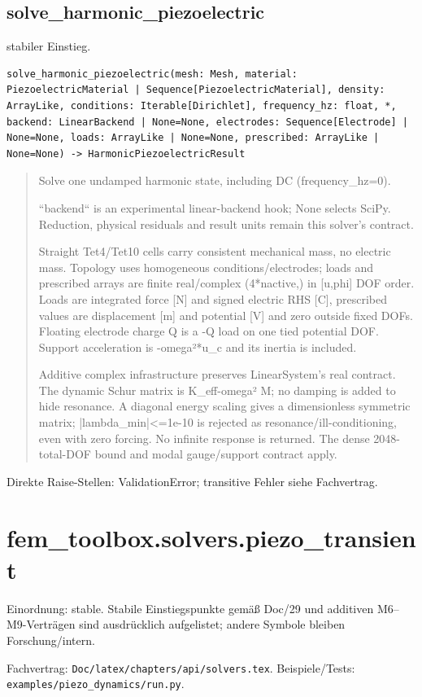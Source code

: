 \subsection{solve\_harmonic\_piezoelectric}
stabiler Einstieg.
\begin{lstlisting}
solve_harmonic_piezoelectric(mesh: Mesh, material: PiezoelectricMaterial | Sequence[PiezoelectricMaterial], density: ArrayLike, conditions: Iterable[Dirichlet], frequency_hz: float, *, backend: LinearBackend | None=None, electrodes: Sequence[Electrode] | None=None, loads: ArrayLike | None=None, prescribed: ArrayLike | None=None) -> HarmonicPiezoelectricResult
\end{lstlisting}
\begin{quote}
Solve one undamped harmonic state, including DC (frequency\_hz=0).\par ``backend`` is an experimental linear-backend hook; None selects SciPy. Reduction, physical residuals and result units remain this solver's contract.\par Straight Tet4/Tet10 cells carry consistent mechanical mass, no electric mass. Topology uses homogeneous conditions/electrodes; loads and prescribed arrays are finite real/complex (4*nactive,) in [u,phi] DOF order. Loads are integrated force [N] and signed electric RHS [C], prescribed values are displacement [m] and potential [V] and zero outside fixed DOFs. Floating electrode charge Q is a -Q load on one tied potential DOF. Support acceleration is -omega²*u\_c and its inertia is included.\par Additive complex infrastructure preserves LinearSystem's real contract. The dynamic Schur matrix is K\_eff-omega² M; no damping is added to hide resonance. A diagonal energy scaling gives a dimensionless symmetric matrix; |lambda\_min|<=1e-10 is rejected as resonance/ill-conditioning, even with zero forcing. No infinite response is returned. The dense 2048-total-DOF bound and modal gauge/support contract apply.
\end{quote}
Direkte Raise-Stellen: ValidationError; transitive Fehler siehe Fachvertrag.
\section{fem\_toolbox.solvers.piezo\_transient}
Einordnung: stable. Stabile Einstiegspunkte gemäß Doc/29 und additiven M6–M9-Verträgen sind ausdrücklich aufgelistet; andere Symbole bleiben Forschung/intern.
\par Fachvertrag: \nolinkurl{Doc/latex/chapters/api/solvers.tex}. Beispiele/Tests:
\nolinkurl{examples/piezo_dynamics/run.py}.

